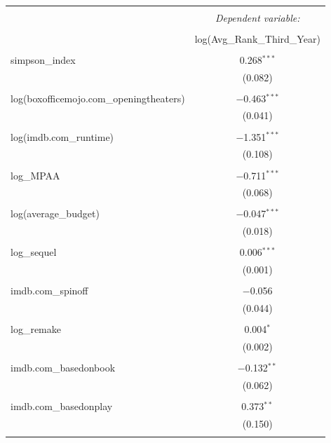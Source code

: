 
\begin{table}[!htbp] \centering 
  \caption{} 
  \label{} 
\begin{tabular}{@{\extracolsep{5pt}}lc} 
\\[-1.8ex]\hline 
\hline \\[-1.8ex] 
 & \multicolumn{1}{c}{\textit{Dependent variable:}} \\ 
\cline{2-2} 
\\[-1.8ex] & log(Avg\_Rank\_Third\_Year) \\ 
\hline \\[-1.8ex] 
 simpson\_index & 0.268$^{***}$ \\ 
  & (0.082) \\ 
  & \\ 
 log(boxofficemojo.com\_openingtheaters) & $-$0.463$^{***}$ \\ 
  & (0.041) \\ 
  & \\ 
 log(imdb.com\_runtime) & $-$1.351$^{***}$ \\ 
  & (0.108) \\ 
  & \\ 
 log\_MPAA & $-$0.711$^{***}$ \\ 
  & (0.068) \\ 
  & \\ 
 log(average\_budget) & $-$0.047$^{***}$ \\ 
  & (0.018) \\ 
  & \\ 
 log\_sequel & 0.006$^{***}$ \\ 
  & (0.001) \\ 
  & \\ 
 imdb.com\_spinoff & $-$0.056 \\ 
  & (0.044) \\ 
  & \\ 
 log\_remake & 0.004$^{*}$ \\ 
  & (0.002) \\ 
  & \\ 
 imdb.com\_basedonbook & $-$0.132$^{**}$ \\ 
  & (0.062) \\ 
  & \\ 
 imdb.com\_basedonplay & 0.373$^{**}$ \\ 
  & (0.150) \\ 
  & \\ 

\end{tabular}
\end{table}
